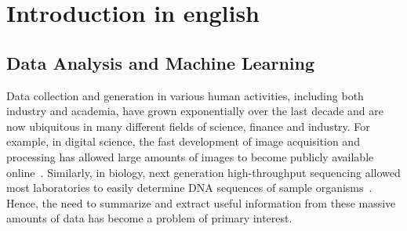 
\section{Introduction in english}

\subsection{Data Analysis and Machine Learning}

Data collection and generation in various human activities, including both industry and academia, have grown 
exponentially over the last decade and are now ubiquitous in many different fields of science, finance and industry.
For example, in digital science, the fast development of image acquisition and processing has allowed large amounts of images to 
become publicly available online~\cite{Lecun98, Krizhevsky09, Nene96, Ojala02, Russell08}.
Similarly, in biology, next generation high-throughput sequencing allowed most laboratories 
to easily determine DNA sequences of sample organisms~\cite{Bindewald06,Goodwin16,Kim16,Metzker10}.  
Hence, the need to summarize and extract useful information from these massive amounts of data has become a problem of primary interest.

